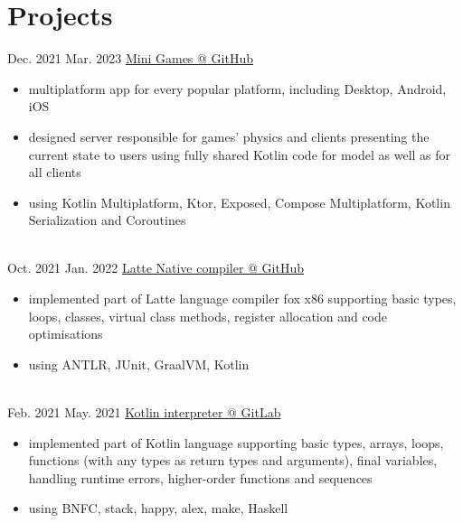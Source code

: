 \documentclass[a4paper]{twentysecondcv} %
\begin{document}
    \vspace{-0.6cm}

    \section{Projects}

    \begin{twenty}
      \twentyitem
      {Dec. 2021}
      {Mar. 2023}
      {\href{https://github.com/avan1235/mini-games}{Mini Games {\footnotesize @ GitHub}}}
      {}
      {}
      {\begin{itemize}
         \item multiplatform app for every popular platform, including Desktop, Android, iOS
         \item designed server responsible for games' physics and clients presenting the current state to users using fully shared Kotlin code for model as well as for all clients
         \item using Kotlin Multiplatform, Ktor, Exposed, Compose Multiplatform, Kotlin Serialization and Coroutines
      \end{itemize}}
      \\
        \twentyitem
        {Oct. 2021}
        {Jan. 2022}
        {\href{https://github.com/avan1235/latte-compiler}{Latte Native compiler {\footnotesize @ GitHub}}}
        {}
        {}
        {\begin{itemize}
             \item implemented part of Latte language compiler fox x86 supporting basic types, loops, classes,
             virtual class methods, register allocation and code optimisations
             \item using ANTLR, JUnit, GraalVM, Kotlin
        \end{itemize}}
        \\
        \twentyitem
        {Feb. 2021}
        {May. 2021}
        {\href{https://gitlab.com/avan1235/kotlin-interpreter}{Kotlin interpreter {\footnotesize @ GitLab}}}
        {}
        {}
        {\begin{itemize}
             \item implemented part of Kotlin language supporting basic types, arrays, loops, functions
             (with any types as return types and arguments), final variables,
             handling runtime errors, higher-order functions and sequences
             \item using BNFC, stack, happy, alex, make, Haskell
        \end{itemize}}

\end{twenty}
\end{document}
